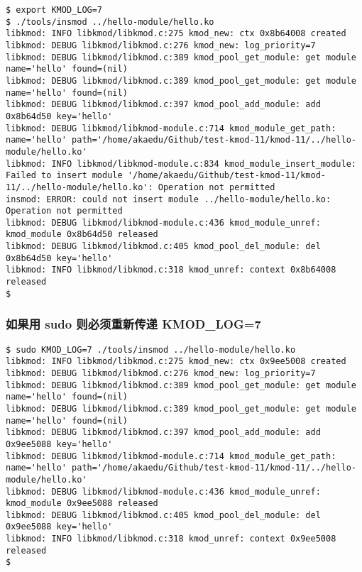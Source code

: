 \documentclass[11pt,a4paper]{article}
\begin{document}
{\begin{shaded}\begin{verbatim}
$ export KMOD_LOG=7
$ ./tools/insmod ../hello-module/hello.ko 
libkmod: INFO libkmod/libkmod.c:275 kmod_new: ctx 0x8b64008 created
libkmod: DEBUG libkmod/libkmod.c:276 kmod_new: log_priority=7
libkmod: DEBUG libkmod/libkmod.c:389 kmod_pool_get_module: get module name='hello' found=(nil)
libkmod: DEBUG libkmod/libkmod.c:389 kmod_pool_get_module: get module name='hello' found=(nil)
libkmod: DEBUG libkmod/libkmod.c:397 kmod_pool_add_module: add 0x8b64d50 key='hello'
libkmod: DEBUG libkmod/libkmod-module.c:714 kmod_module_get_path: name='hello' path='/home/akaedu/Github/test-kmod-11/kmod-11/../hello-module/hello.ko'
libkmod: INFO libkmod/libkmod-module.c:834 kmod_module_insert_module: Failed to insert module '/home/akaedu/Github/test-kmod-11/kmod-11/../hello-module/hello.ko': Operation not permitted
insmod: ERROR: could not insert module ../hello-module/hello.ko: Operation not permitted
libkmod: DEBUG libkmod/libkmod-module.c:436 kmod_module_unref: kmod_module 0x8b64d50 released
libkmod: DEBUG libkmod/libkmod.c:405 kmod_pool_del_module: del 0x8b64d50 key='hello'
libkmod: INFO libkmod/libkmod.c:318 kmod_unref: context 0x8b64008 released
$ 
\end{verbatim}\end{shaded}}
\subsubsection{如果用 sudo 则必须重新传递 KMOD\_LOG=7}

{\begin{shaded}\begin{verbatim}
$ sudo KMOD_LOG=7 ./tools/insmod ../hello-module/hello.ko 
libkmod: INFO libkmod/libkmod.c:275 kmod_new: ctx 0x9ee5008 created
libkmod: DEBUG libkmod/libkmod.c:276 kmod_new: log_priority=7
libkmod: DEBUG libkmod/libkmod.c:389 kmod_pool_get_module: get module name='hello' found=(nil)
libkmod: DEBUG libkmod/libkmod.c:389 kmod_pool_get_module: get module name='hello' found=(nil)
libkmod: DEBUG libkmod/libkmod.c:397 kmod_pool_add_module: add 0x9ee5088 key='hello'
libkmod: DEBUG libkmod/libkmod-module.c:714 kmod_module_get_path: name='hello' path='/home/akaedu/Github/test-kmod-11/kmod-11/../hello-module/hello.ko'
libkmod: DEBUG libkmod/libkmod-module.c:436 kmod_module_unref: kmod_module 0x9ee5088 released
libkmod: DEBUG libkmod/libkmod.c:405 kmod_pool_del_module: del 0x9ee5088 key='hello'
libkmod: INFO libkmod/libkmod.c:318 kmod_unref: context 0x9ee5008 released
$ 
\end{verbatim}\end{shaded}}
\end{document}
